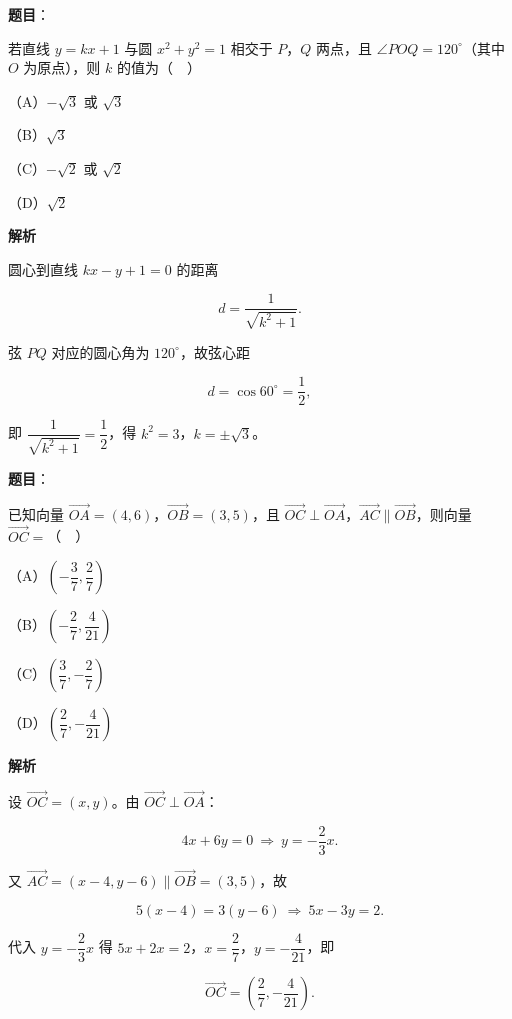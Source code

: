\begin{answer}

\textbf{题目}：

若直线 $y=kx+1$ 与圆 $x^2+y^2=1$ 相交于 $P$，$Q$ 两点，且 $\angle POQ=120^\circ$（其中 $O$ 为原点），则 $k$ 的值为（　）

（A）$-\sqrt3$ 或 $\sqrt3$

（B）$\sqrt3$

（C）$-\sqrt2$ 或 $\sqrt2$

（D）$\sqrt2$

\textbf{解析}

圆心到直线 $kx-y+1=0$ 的距离

\nopagebreak[4]
\[d=\frac1{\sqrt{k^2+1}}.\]

弦 $PQ$ 对应的圆心角为 $120^\circ$，故弦心距

\nopagebreak[4]
\[d=\cos60^\circ=\frac12,\]

即 $\dfrac1{\sqrt{k^2+1}}=\dfrac12$，得 $k^2=3$，$k=\pm\sqrt3$。


\end{answer}
\begin{answer}

\textbf{题目}：

已知向量 $\overrightarrow{OA}=(4,6)$，$\overrightarrow{OB}=(3,5)$，且 $\overrightarrow{OC}\perp\overrightarrow{OA}$，$\overrightarrow{AC}\parallel\overrightarrow{OB}$，则向量 $\overrightarrow{OC}=$（　）

（A）$\left(-\dfrac37,\dfrac27\right)$

（B）$\left(-\dfrac27,\dfrac4{21}\right)$

（C）$\left(\dfrac37,-\dfrac27\right)$

（D）$\left(\dfrac27,-\dfrac4{21}\right)$

\textbf{解析}

设 $\overrightarrow{OC}=(x,y)$。由 $\overrightarrow{OC}\perp\overrightarrow{OA}$：

\nopagebreak[4]
\[4x+6y=0\ \Rightarrow\ y=-\frac23x.\]

又 $\overrightarrow{AC}=(x-4,y-6)\parallel\overrightarrow{OB}=(3,5)$，故

\nopagebreak[4]
\[5(x-4)=3(y-6)\ \Rightarrow\ 5x-3y=2.\]

代入 $y=-\dfrac23x$ 得 $5x+2x=2$，$x=\dfrac27$，$y=-\dfrac4{21}$，即

\nopagebreak[4]
\[\overrightarrow{OC}=\left(\frac27,-\frac4{21}\right).\]


\end{answer}
